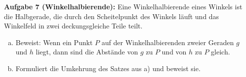 \documentclass{../cssheet}
\begin{document}
\textbf{Aufgabe 7 (Winkelhalbierende):} Eine Winkelhalbierende eines Winkels ist die Halbgerade, die durch den Scheitelpunkt des Winkels läuft und das Winkelfeld in zwei deckungsgleiche Teile teilt.

\begin{enumerate}[a)]
\item Beweist: Wenn ein Punkt $P$ auf der Winkelhalbierenden zweier Geraden $g$ und $h$ liegt, dann sind die Abstände von $g$ zu $P$ und von $h$ zu $P$ gleich.
\item Formuliert die Umkehrung des Satzes aus a) und beweist sie.
\end{enumerate}

\newpage
\printlicense

\printsocials

\end{document}
